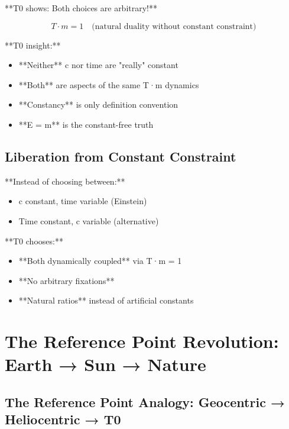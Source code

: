 \documentclass[12pt,a4paper]{article}
\newcommand{\Tfield}{T}
\begin{document}
{{{{{						**T0 shows: Both choices are arbitrary!**
						
						\begin{equation}
							\Tfield \cdot m = 1 \quad \text{(natural duality without constant constraint)}
						\end{equation}
						
						**T0 insight:**
						\begin{itemize}
							\item **Neither** c nor time are "really" constant
							\item **Both** are aspects of the same T·m dynamics
							\item **Constancy** is only definition convention
							\item **E = m** is the constant-free truth
						\end{itemize}
						
						\subsection{Liberation from Constant Constraint}
						
						**Instead of choosing between:**
						\begin{itemize}
							\item c constant, time variable (Einstein)
							\item Time constant, c variable (alternative)
						\end{itemize}
						
						**T0 chooses:**
						\begin{itemize}
							\item **Both dynamically coupled** via T·m = 1
							\item **No arbitrary fixations**
							\item **Natural ratios** instead of artificial constants
						\end{itemize}
						
						\section{The Reference Point Revolution: Earth → Sun → Nature}
						
						\subsection{The Reference Point Analogy: Geocentric → Heliocentric → T0}
						
}}}}}
\end{document}
